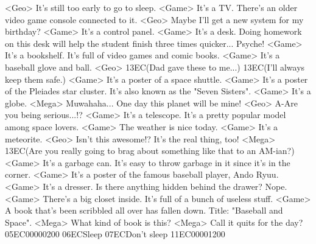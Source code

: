 <Geo> It's still too early to go to sleep. 
<Game> It's a TV. 
There's an older video game console connected to it. 
<Geo> Maybe I'll get a new system for my birthday? 
<Game> It's a control panel. 
<Game> It's a desk. 
Doing homework on this desk will help the student finish three times quicker... 
Psyche! 
<Game> It's a bookshelf. 
It's full of video games and comic books. 
<Game> It's a baseball glove and ball. 
<Geo> {13}{EC}(Dad gave these to me...) 
{13}{EC}(I'll always keep them safe.) 
<Game> It's a poster of a space shuttle. 
<Game> It's a poster of the Pleiades star cluster. 
It's also known as the "Seven Sisters". 
<Game> It's a globe. 
<Mega> Muwahaha... One day this planet will be mine! 
<Geo> A-Are you being serious...!? 
<Game> It's a telescope. 
It's a pretty popular model among space lovers. 
<Game> The weather is nice today. 
<Game> It's a meteorite. 
<Geo> Isn't this awesome!? It's the real thing, too! 
<Mega> {13}{EC}(Are you really going to  brag about something  like that to an AM-ian?) 
<Game> It's a garbage can. It's easy to throw garbage in it since it's in the corner. 
<Game> It's a poster of the famous baseball player, Ando Ryuu. 
<Game> It's a dresser. Is there anything hidden behind the drawer? 
Nope. 
<Game> There's a big closet inside. It's full of a bunch of useless stuff. 
<Game> A book that's been scribbled all over has fallen down. 
Title: "Baseball and Space". 
<Mega> What kind of book is this? 
<Mega> Call it quits for the day? {05}{EC}{00}{00}{02}{00}    {06}{EC}Sleep    {07}{EC}Don't sleep 
{11}{EC}{00}{00}{12}{00}
